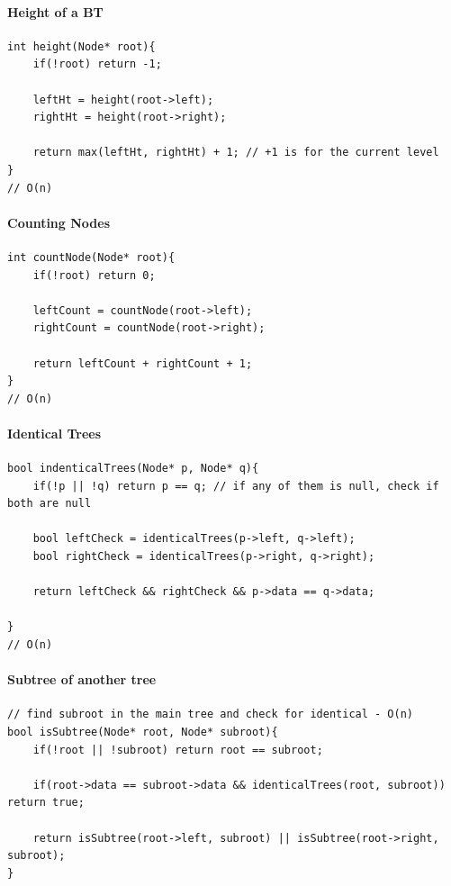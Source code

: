 \documentclass[11pt]{article}
\begin{document}
\paragraph{Height of a BT}
\begin{minipage}{\linewidth}
\begin{lstlisting}
int height(Node* root){
	if(!root) return -1;

	leftHt = height(root->left);
	rightHt = height(root->right);

	return max(leftHt, rightHt) + 1; // +1 is for the current level
}
// O(n)
\end{lstlisting}
\end{minipage}

\paragraph{Counting Nodes}
\begin{minipage}{\linewidth}
\begin{lstlisting}
int countNode(Node* root){
	if(!root) return 0;

	leftCount = countNode(root->left);
	rightCount = countNode(root->right);

	return leftCount + rightCount + 1;
}
// O(n)
\end{lstlisting}
\end{minipage}

\paragraph{Identical Trees}
\begin{minipage}{\linewidth}
\begin{lstlisting}
bool indenticalTrees(Node* p, Node* q){
	if(!p || !q) return p == q; // if any of them is null, check if both are null

	bool leftCheck = identicalTrees(p->left, q->left);
	bool rightCheck = identicalTrees(p->right, q->right);

	return leftCheck && rightCheck && p->data == q->data;

}
// O(n)
\end{lstlisting}
\end{minipage}

\paragraph{Subtree of another tree}
\begin{minipage}{\linewidth}
\begin{lstlisting}
// find subroot in the main tree and check for identical - O(n)
bool isSubtree(Node* root, Node* subroot){
	if(!root || !subroot) return root == subroot;

	if(root->data == subroot->data && identicalTrees(root, subroot)) return true;

	return isSubtree(root->left, subroot) || isSubtree(root->right, subroot);
}
\end{lstlisting}
\end{minipage}
\end{document}
